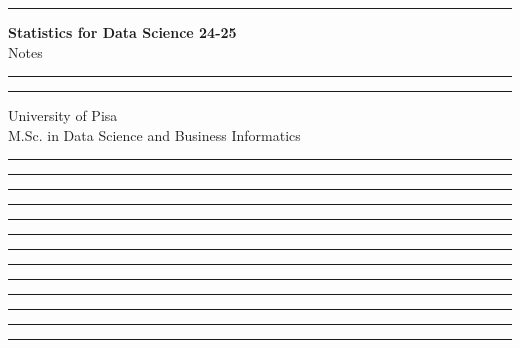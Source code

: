 \documentclass[11pt]{article}
\newcommand{\separate}{\begin{center}\textcolor{NavyBlue}{\rule{16cm}{1mm}}\end{center}}
\begin{document}
\begin{titlepage}
    \hrule
    \vspace{15pt}
    \begin{center}
        \Huge{\textbf{\Huge \textbf{Statistics for Data Science 24-25}} \\ Notes}\\
    \end{center}
    \vspace{15pt}
    \hrule
    \vfill
    \hrule
    \begin{center}
        \Large University of Pisa \\ M.Sc. in Data Science and Business Informatics
    \end{center}
\end{titlepage}

\tableofcontents
\clearpage


\separate
\separate
\separate
\separate
\separate
\separate
\separate
\separate
\separate
\separate
\separate
\separate
\separate
\end{document}
